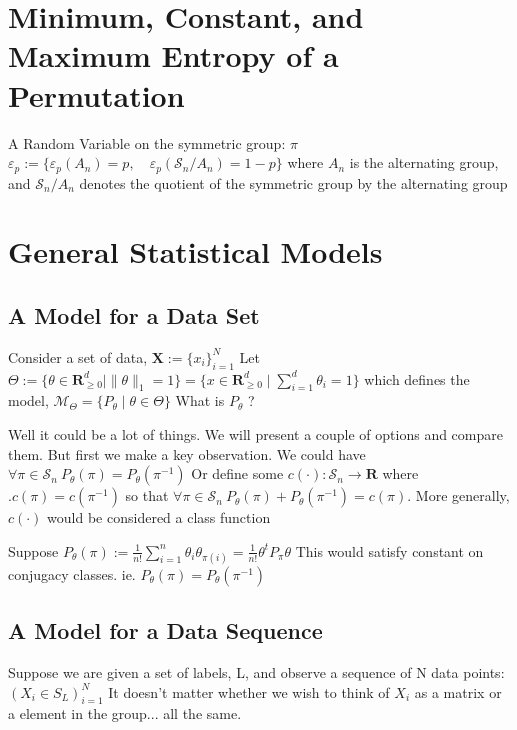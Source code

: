 \documentclass{article}
\theoremstyle{definition}
\begin{document}
\section{Minimum, Constant, and Maximum Entropy of a Permutation }

A Random Variable on the symmetric group:
$ \pi $ ~ $ \varepsilon_p := \{\varepsilon_p(A_n) =p, \quad \varepsilon_p(\mathcal{S}_n / A_n) = 1-p \} $ where $A_n$ is the alternating group, and $\mathcal{S}_n / A_n$ denotes the quotient of the symmetric group by the alternating group


\section{General Statistical Models}
\subsection{A Model for a Data Set}
Consider a set of data, \( \mathbf{X} := \{ x_i \}_{i=1}^N\)
Let \(
\Theta := \{ \theta \in \mathbf{R}_{\geq 0}^d \mid  \|\theta\|_1 = 1\} = \{x\in \mathbf{R}_{\geq 0}^d \mid \sum_{i=1}^d \theta_i = 1\} 
\) 
which defines the model, \(
\mathcal{M}_\Theta = \{ P_\theta \mid \theta \in \Theta \}
\)
What is $P_\theta$ ? 

Well it could be a lot of things. We will present a couple of options and compare them. But first we make a key observation. 
We could have $ \forall \pi \in \mathcal{S}_n \: P_\theta(\pi) = P_\theta(\pi^{-1}) $
Or define some $c(\cdot):\mathcal{S}_n \rightarrow \mathbf{R} $ where $. c(\pi) = c(\pi^{-1}) $ so that $ \forall \pi \in \mathcal{S}_n \: P_\theta(\pi) + P_\theta(\pi^{-1})  = c( \pi ) $. More generally, $c(\cdot) $ would be considered a class function

Suppose \( P_\theta(\pi) := \frac{1}{n!}\sum_{i=1}^n \theta_i\theta_{\pi(i)} = \frac{1}{n!}\theta^t P_\pi\theta \) 
This would satisfy constant on conjugacy classes. ie. $ P_\theta(\pi) = P_\theta(\pi^{-1}) $

\subsection{A Model for a Data Sequence}
Suppose we are given a set of labels, L, and observe a sequence of N data points: $ (X_i \in S_L)_{i=1}^N$
It doesn't matter whether we wish to think of $X_i$ as a matrix or a element in the group... all the same.
\end{document}
